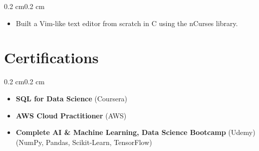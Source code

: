 \documentclass[10pt, letterpaper]{article}
\newenvironment{highlights}{
    \begin{itemize}[
        topsep=0.10 cm,
        parsep=0.10 cm,
        partopsep=0pt,
        itemsep=0pt,
        leftmargin=0.4 cm + 10pt
    ]
}{
    \end{itemize}
}
\newenvironment{onecolentry}{
    \begin{adjustwidth}{0.2 cm}{0.2 cm}
}{
    \end{adjustwidth}
}
\begin{document}
\vspace{0.10 cm}
\begin{onecolentry}
    \begin{highlights}
        \item Built a Vim-like text editor from scratch in C using the nCurses library.
    \end{highlights}
\end{onecolentry}

\section{Certifications}

\begin{onecolentry}
    \begin{highlights}
        \item \textbf{SQL for Data Science} (Coursera)\vspace{0.15cm}
        \item \textbf{AWS Cloud Practitioner} (AWS)\vspace{0.15cm}
        \item \textbf{Complete AI \& Machine Learning, Data Science Bootcamp} (Udemy)\\
        (NumPy, Pandas, Scikit-Learn, TensorFlow)
    \end{highlights}
\end{onecolentry}
\end{document}
